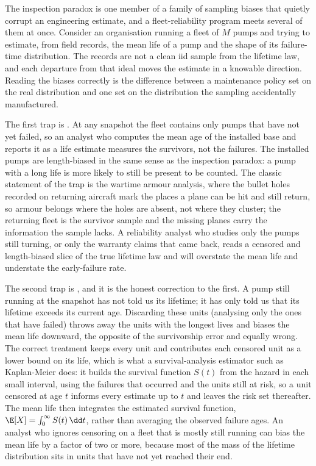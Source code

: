 The inspection paradox is one member of a family of sampling biases that
quietly corrupt an engineering estimate, and a fleet-reliability program
meets several of them at once. Consider an organisation running a fleet
of $M$ pumps and trying to estimate, from field records, the mean life of
a pump and the shape of its failure-time distribution. The records are
not a clean iid sample from the lifetime law, and each departure from
that ideal moves the estimate in a knowable direction. Reading the biases
correctly is the difference between a maintenance policy set on the real
distribution and one set on the distribution the sampling accidentally
manufactured.

The first trap is . At any snapshot the fleet
contains only pumps that have not yet failed, so an analyst who computes
the mean age of the installed base and reports it as a life estimate
measures the survivors, not the failures. The installed pumps are
length-biased in the same sense as the inspection paradox: a pump with a
long life is more likely to still be present to be counted. The classic
statement of the trap is the wartime armour analysis, where the bullet
holes recorded on returning aircraft mark the places a plane can be hit
and still return, so armour belongs where the holes are absent, not where
they cluster; the returning fleet is the survivor sample and the missing
planes carry the information the sample lacks. A reliability analyst who
studies only the pumps still turning, or only the warranty claims that
came back, reads a censored and length-biased slice of the true lifetime
law and will overstate the mean life and understate the early-failure
rate.

The second trap is , and it is the honest
correction to the first. A pump still running at the snapshot has not told
us its lifetime; it has only told us that its lifetime exceeds its current
age. Discarding these units (analysing only the ones that have failed)
throws away the units with the longest lives and biases the mean life
downward, the opposite of the survivorship error and equally wrong. The
correct treatment keeps every unit and contributes each censored unit as
a lower bound on its life, which is what a survival-analysis estimator
such as Kaplan-Meier does: it builds the survival function $S(t)$ from the
hazard in each small interval, using the failures that occurred and the
units still at risk, so a unit censored at age $t$ informs every estimate
up to $t$ and leaves the risk set thereafter. The mean life then
integrates the estimated survival function, $\E[X] = \int_{0}^{\infty}
S(t)\,\dd t$, rather than averaging the observed failure ages. An analyst
who ignores censoring on a fleet that is mostly still running can bias the
mean life by a factor of two or more, because most of the mass of the
lifetime distribution sits in units that have not yet reached their end.


